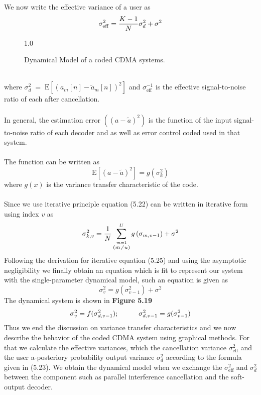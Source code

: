 We now write the effective variance of a user as
\begin{equation}
\sigma_{\mathrm{eff}}^2=\frac{\hbox{$K-1$}}{\hbox{$N$}}\sigma_d^2+\sigma^2
\end{equation}
\begin{figure}[htb]
\centerline{  {1.0} }
\caption{Dynamical Model of a coded CDMA systems.}
\end{figure}\\
where $\sigma_d^2\;=\;\mathrm{E}\left[\left({{a}}_m[n]-{{\tilde{a}}}_m[n]\right)^2\right]$ and $\sigma_{\mathrm{eff}}^{-1}$ is the effective signal-to-noise ratio of each after cancellation.\\ \\
In general, the estimation error $\left(({{a}}-{{\tilde{a}}})^2\right)$ is the function of the input signal-to-noise ratio of each decoder and as well as error control coded used in that system.\\ \\
The function can be written as
\begin{equation}
\mathrm{E}\left[\left({{a}}-{{\tilde{a}}}\right)^2\right]=g\left(\sigma_k^2\right)
\end{equation}
where $g(x)$ is the variance transfer characteristic of the code. \\ \\
Since we use iterative principle equation (5.22) can be written in iterative form using index $v$ as
\begin{equation}
\sigma_{k,v}^2=\frac{\hbox{$1$}}{\hbox{$N$}}\sum\limits_{\stackrel{m=1}{(m\neq u)}}^{U}g\left(\sigma_{m,v-1}\right)+\sigma^2
\end{equation}
Following the derivation for iterative equation (5.25) \cite{VTC} and using the asymptotic negligibility we finally obtain an equation which is fit to represent our system with the single-parameter dynamical model, such an equation is given as
\begin{equation}
\sigma_v^2=g\left(\sigma_{v-1}^2\right)+\sigma^2
\end{equation}
The dynamical system is shown in \textbf{Figure 5.19}
\begin{equation}
\sigma_v^2=f(\sigma^2_{d,v-1}); \hspace{10mm} \sigma^2_{d,v-1}=g(\sigma^2_{v-1})
\end{equation}
Thus we end the discussion on variance transfer characteristics and we now describe the behavior of the coded CDMA system using graphical methods. For that we calculate the effective variances, which the cancellation variance $\sigma_{\mathrm{eff}}^2$ and the user a-posteriory probability output variance $\sigma_d^2$ according to the formula given in (5.23). We obtain the dynamical model when we exchange the $\sigma_{\mathrm{eff}}^2$ and $\sigma_d^2$ between the component such as parallel interference cancellation and the soft-output decoder. 

